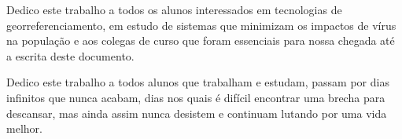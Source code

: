 
Dedico este trabalho a todos os alunos interessados em tecnologias de georreferenciamento, em estudo de sistemas que minimizam os impactos de vírus na população e aos colegas de curso que foram essenciais para nossa chegada até a escrita deste documento.

Dedico este trabalho a todos alunos que trabalham e estudam, passam por dias infinitos que nunca acabam, dias nos quais é difícil encontrar uma brecha para descansar, mas ainda assim nunca desistem e continuam lutando por uma vida melhor. 